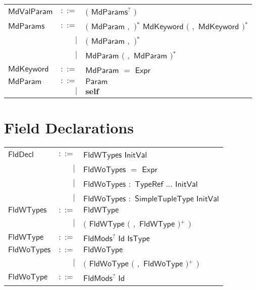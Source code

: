 
\begin{longtable}[l]{p{3cm}rl}
$\mathsf{MdValParam}$ &  $\mathsf{::=}$  & $\big($  $\mathsf{MdParams}$$^?$ $\big)$ \\
$\mathsf{MdParams}$ &  $\mathsf{::=}$  & $\big($  $\mathsf{MdParam}$ $\mathbf{,}$ $\big)$$^*$ $\mathsf{MdKeyword}$ $\big($  $\mathbf{,}$ $\mathsf{MdKeyword}$ $\big)$$^*$ \\
 & $\big|$ &  $\big($  $\mathsf{MdParam}$ $\mathbf{,}$ $\big)$$^*$ \\
 & $\big|$ &  $\mathsf{MdParam}$ $\big($  $\mathbf{,}$ $\mathsf{MdParam}$ $\big)$$^*$ \\
$\mathsf{MdKeyword}$ &  $\mathsf{::=}$  & $\mathsf{MdParam}$ $\mathbf{=}$ $\mathsf{Expr}$ \\
$\mathsf{MdParam}$ &  $\mathsf{::=}$  & $\mathsf{Param}$ \\
 & $\big|$ &  $\mathbf{self}$ \\
\end{longtable} \hfill 

\section{Field Declarations} 

 
\begin{longtable}[l]{p{3cm}rl}
$\mathsf{FldDecl}$ &  $\mathsf{::=}$  & $\mathsf{FldWTypes}$ $\mathsf{InitVal}$ \\
 & $\big|$ &  $\mathsf{FldWoTypes}$ $\mathbf{=}$ $\mathsf{Expr}$ \\
 & $\big|$ &  $\mathsf{FldWoTypes}$ $\mathbf{:}$ $\mathsf{TypeRef}$ $\mathbf{...}$ $\mathsf{InitVal}$ \\
 & $\big|$ &  $\mathsf{FldWoTypes}$ $\mathbf{:}$ $\mathsf{SimpleTupleType}$ $\mathsf{InitVal}$ \\
$\mathsf{FldWTypes}$ &  $\mathsf{::=}$  & $\mathsf{FldWType}$ \\
 & $\big|$ &  $\big($  $\mathsf{FldWType}$ $\big($  $\mathbf{,}$ $\mathsf{FldWType}$ $\big)$$^+$ $\big)$ \\
$\mathsf{FldWType}$ &  $\mathsf{::=}$  & $\mathsf{FldMods}$$^?$ $\mathsf{Id}$ $\mathsf{IsType}$ \\
$\mathsf{FldWoTypes}$ &  $\mathsf{::=}$  & $\mathsf{FldWoType}$ \\
 & $\big|$ &  $\big($  $\mathsf{FldWoType}$ $\big($  $\mathbf{,}$ $\mathsf{FldWoType}$ $\big)$$^+$ $\big)$ \\
$\mathsf{FldWoType}$ &  $\mathsf{::=}$  & $\mathsf{FldMods}$$^?$ $\mathsf{Id}$ \\
\end{longtable} \hfill 

